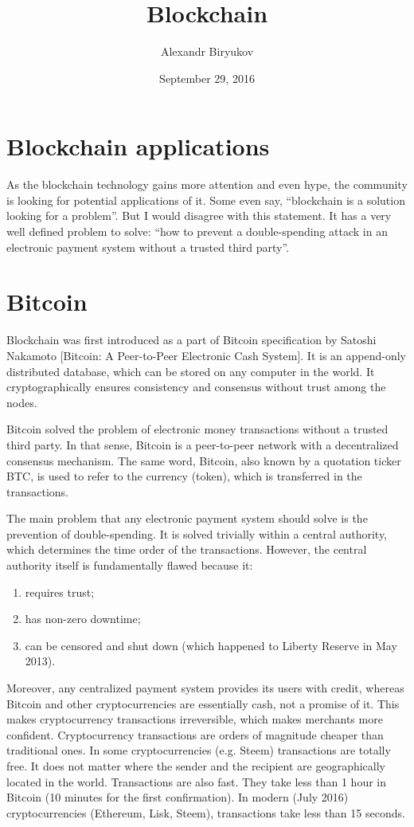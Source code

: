 \documentclass{article}
\title{Blockchain}
\author{Alexandr Biryukov}
\date{September 29, 2016}
\begin{document}
\maketitle

\section{Blockchain applications}
As the blockchain technology gains more attention and even hype, the community is looking for potential applications of it. Some even say, “blockchain is a solution looking for a problem”. But I would disagree with this statement. It has a very well defined problem to solve: “how to prevent a double-spending attack in an electronic payment system without a trusted third party”.

\section{Bitcoin}
Blockchain was first introduced as a part of Bitcoin specification by Satoshi Nakamoto [Bitcoin: A Peer-to-Peer Electronic Cash System]. It is an append-only distributed database, which can be stored on any computer in the world. It cryptographically ensures consistency and consensus without trust among the nodes.

Bitcoin solved the problem of electronic money transactions without a trusted third party. In that sense, Bitcoin is a peer-to-peer network with a decentralized consensus mechanism. The same word, Bitcoin, also known by a quotation ticker BTC, is used to refer to the currency (token), which is transferred in the transactions.

The main problem that any electronic payment system should solve is the prevention of double-spending. It is solved trivially within a central authority, which determines the time order of the transactions. However, the central authority itself is fundamentally flawed because it:

    \begin{enumerate}
        \item requires trust;  
        \item has non-zero downtime;
        \item can be censored and shut down (which happened to Liberty Reserve in May 2013).
    \end{enumerate}

Moreover, any centralized payment system provides its users with credit, whereas Bitcoin and other cryptocurrencies are essentially cash, not a promise of it. This makes cryptocurrency transactions irreversible, which makes merchants more confident. Cryptocurrency transactions are orders of magnitude cheaper than traditional ones. In some cryptocurrencies (e.g. Steem) transactions are totally free. It does not matter where the sender and the recipient are geographically located in the world. Transactions are also fast. They take less than 1 hour in Bitcoin (10 minutes for the first confirmation). In modern (July 2016) cryptocurrencies (Ethereum, Lisk, Steem), transactions take less than 15 seconds.
\end{document}
